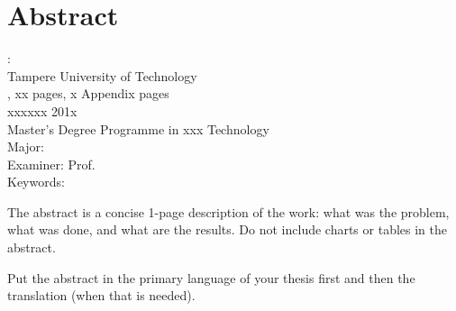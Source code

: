 \documentclass[12pt,a4paper,english
]{tutthesis}
\begin{document}
\chapter*{Abstract}

\begin{spacing}{1.0}
         {\bf \textsf{\MakeUppercase{\@author}}}: \@title\\   %
         \textsf{Tampere University of Technology}\\
         \textsf{\@thesistype, xx pages, x Appendix pages} \\
         \textsf{xxxxxx 201x}\\
         \textsf{Master's Degree Programme in xxx Technology}\\
         \textsf{Major: }\\
         \textsf{Examiner: Prof. \@examiner}\\ %
         \textsf{Keywords: }\\
\end{spacing}


The abstract is a concise 1-page description of the work: what was the
problem, what was done, and what are the results. Do not include
charts or tables in the abstract.

Put the abstract in the primary language of your thesis first and then
the translation (when that is needed).


\end{document}
